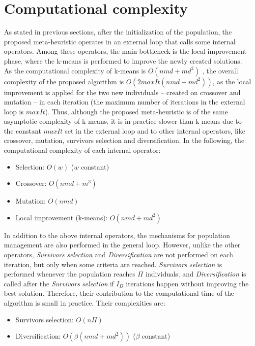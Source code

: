\section{Computational complexity}
\label{sec:complexity-algo}
As stated in previous sections, after the initialization of the population, the proposed meta-heuristic operates in an external loop that calls some internal operators. Among these operators, the main bottleneck is the local improvement phase, where the k-means is performed to improve the newly created solutions. As the computational complexity of k-means is $O(nmd + md^2)$ \cite{Hamerly2010}, the overall complexity of the proposed algorithm is $O(2 maxIt (nmd + md^2))$, as the local improvement is applied for the two new individuals -- created on crossover and mutation -- in each iteration (the maximum number of iterations in the external loop is $maxIt$). Thus, although the proposed meta-heuristic is of the same asymptotic complexity of k-means, it is in practice slower than k-means due to the constant $maxIt$ set in the external loop and to other internal operators, like crossover, mutation, survivors selection and diversification. In the following, the computational complexity of each internal operator:



\begin{itemize}

	\item Selection: $O(w)$ ($w$ constant)

	\item Crossover: $O(nmd + m^{3})$

	\item Mutation: $O(nmd)$

	\item Local improvement (k-means): $O(nmd + md^2)$

\end{itemize}

In addition to the above internal operators, the mechanisms for population management are also performed in the general loop. However, unlike the other operators, \textit{Survivors selection} and \textit{Diversification} are not performed on each iteration, but only when some criteria are reached. \textit{Survivors selection} is performed whenever the population reaches $\Pi$ individuals; and \textit{Diversification} is called after the \textit{Survivors selection} if $I_D$ iterations happen without improving the best solution. Therefore, their contribution to the computational time of the algorithm is small in practice. Their complexities are:

\begin{itemize}

	\item Survivors selection: $O(n\Pi)$

	\item Diversification: $O(\beta (nmd + md^2))$ ($\beta$ constant)

\end{itemize}